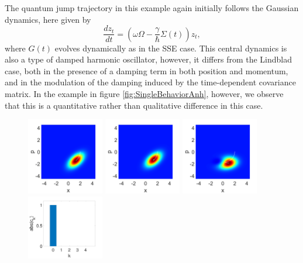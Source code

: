 \documentclass[12pt]{iopart} %
\begin{document}
The quantum jump trajectory in this example again initially follows the Gaussian dynamics, here given by
\begin{equation}
  \frac{d  z_t}{d t}=\left(\omega \Omega  -\frac{\gamma}{\hbar} \Sigma(t)\right) z_t,
\end{equation} 
where $G(t)$ evolves dynamically as in the SSE case. This central dynamics is also a type of damped harmonic oscillator, however, it differs from the Lindblad case, both in the presence of a damping term in both position and momentum, and in the modulation of the damping induced by the time-dependent covariance matrix. In the example in figure \ref{fig:SingleBehaviorAnh}, however, we observe that this is a quantitative rather than qualitative difference in this case. 

\begin{figure}
\begin{centering}
	  \includegraphics[width=0.3\textwidth]{WigJump1Anh.pdf}
	  \includegraphics[width=0.3\textwidth]{WigJump2Anh.pdf}
	  \includegraphics[width=0.3\textwidth]{WigJump3Anh.pdf} \\
	  \includegraphics[width=0.3\textwidth]{HistogramAnh1.pdf}

\end{centering}
\end{figure}
\end{document}
